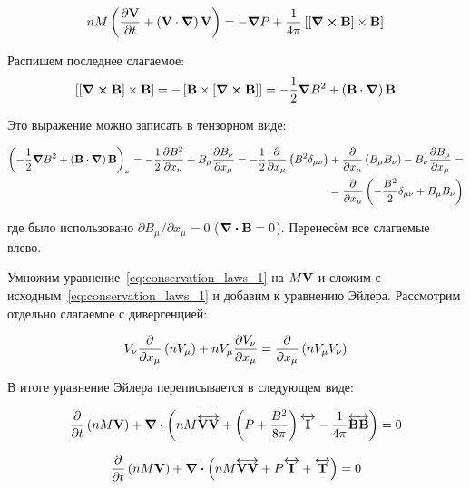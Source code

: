 \documentclass[10pt, a4paper]{article}
\begin{document}
\begin{equation*}
	n M \left( \pdv{\vb{V}}{t} + \left( \vb{V}\cdot\grad \right)\vb{V} \right) = -\grad{P} + \frac{1}{4\pi}\left[\left[ \curl{\vb{B}} \right]\times\vb{B}\right]
\end{equation*}

Распишем последнее слагаемое:
\begin{equation*}
	\left[\left[ \curl{\vb{B}} \right]\times\vb{B}\right] = -\left[\vb{B}\times\left[ \curl{\vb{B}} \right]\right] = -\frac{1}{2}\grad{B^2} + \left( \vb{B} \cdot\grad \right)\vb{B}
\end{equation*}

Это выражение можно записать в тензорном виде:

\begin{equation*}
	\begin{split}
		\left( -\frac{1}{2}\grad{B^2} + \left( \vb{B} \cdot\grad \right)\vb{B} \right)_\nu = -\frac{1}{2}\pdv{B^2}{x_\nu} + B_\mu\pdv{B_\nu}{x_\mu}= -\frac{1}{2}\pdv{}{x_\mu}\left( B^2 \delta_{\mu\nu} \right) + \pdv{}{x_\mu}\left( B_\mu B_\nu \right) - B_\nu\pdv{B_\mu}{x_\mu} =\\= \pdv{}{x_\mu}\left( -\frac{B^2}{2} \delta_{\mu\nu} + B_\mu B_\nu \right)
	\end{split}
\end{equation*}

где было использовано $\partial B_\mu/\partial x_\mu = 0$ ($\div{\vb{B}}=0$). Перенесём все слагаемые влево.

Умножим уравнение~\eqref{eq:conservation_laws_1} на $M\vb{V}$ и сложим с исходным~\eqref{eq:conservation_laws_1} и добавим к уравнению Эйлера. Рассмотрим отдельно слагаемое с дивергенцией:

\begin{equation*}
	V_\nu \pdv{}{x_\mu}\left( nV_\mu \right) + nV_\mu\pdv{V_\nu}{x_\mu} = \pdv{}{x_\mu}\left( nV_\mu V_\nu \right)
\end{equation*}

В итоге уравнение Эйлера переписывается в следующем виде:

\begin{equation*}
	\pdv{}{t}\left( nM\vb{V} \right) + \div{\left( nM\overleftrightarrow{\vb{VV}} + \left( P + \frac{B^2}{8\pi} \right)\overleftrightarrow{\vb{I}} - \frac{1}{4\pi}\overleftrightarrow{\vb{BB}} \right)} = 0
\end{equation*}

\begin{equation*}
	\pdv{}{t}\left( nM\vb{V} \right) + \div{\left( nM\overleftrightarrow{\vb{VV}} + P\overleftrightarrow{\vb{I}} + \overleftrightarrow{\vb{T}} \right)} = 0
\end{equation*}
\end{document}
